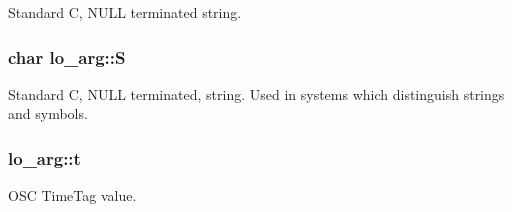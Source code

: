 Standard C, N\+U\+L\+L terminated string. \hypertarget{unionlo__arg_ab9c6a9c09ea094d58f889ed1a5edba0b}{
\subsubsection[{S}]{\setlength{\rightskip}{0pt plus 5cm}char lo\+\_\+arg\+::\+S}}\label{unionlo__arg_ab9c6a9c09ea094d58f889ed1a5edba0b}
Standard C, N\+U\+L\+L terminated, string. Used in systems which distinguish strings and symbols. \hypertarget{unionlo__arg_afc89e5569fba7a660638839366b17408}{
\subsubsection[{t}]{ lo\+\_\+arg\+::t}}\label{unionlo__arg_afc89e5569fba7a660638839366b17408}
O\+S\+C Time\+Tag value. 